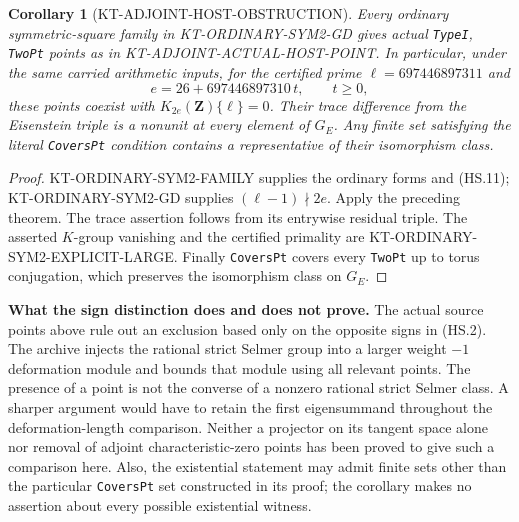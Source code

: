 \documentclass[11pt,a4paper]{article}
\newtheorem{corollary}[theorem]{Corollary}
\theoremstyle{definition}
\renewcommand{\paragraph}[1]{\par\smallskip\noindent\textbf{#1}\quad\ignorespaces}
\begin{document}
\begin{corollary}[KT-ADJOINT-HOST-OBSTRUCTION]
Every ordinary symmetric-square family in
KT-ORDINARY-SYM2-GD gives actual \texttt{TypeI},
\texttt{TwoPt} points as in KT-ADJOINT-ACTUAL-HOST-POINT.
In particular, under the same carried arithmetic inputs,
for the certified prime $\ell=697446897311$ and
\[
                   e=26+697446897310\,t,\qquad t\geq0,
\]
these points coexist with $K_{2e}(\mathbf Z)\{\ell\}=0$.
Their trace difference from the Eisenstein triple is a
nonunit at every element of $G_E$.  Any finite set satisfying
the literal \texttt{CoversPt} condition contains a
representative of their isomorphism class.
\end{corollary}
\begin{proof}
KT-ORDINARY-SYM2-FAMILY supplies the ordinary forms and
(HS.11); KT-ORDINARY-SYM2-GD supplies
$(\ell-1)\nmid2e$.  Apply the preceding theorem.
The trace assertion follows from its entrywise residual
triple.  The asserted $K$-group vanishing and the certified
primality are KT-ORDINARY-SYM2-EXPLICIT-LARGE.
Finally \texttt{CoversPt} covers every \texttt{TwoPt}
up to torus conjugation, which preserves the isomorphism
class on $G_E$.
\end{proof}

\paragraph{What the sign distinction does and does not prove.}
The actual source points above rule out an exclusion based
only on the opposite signs in (HS.2).  The archive injects
the rational strict Selmer group into a larger weight
$-1$ deformation module and bounds that module using all
relevant points.  The presence of a point is not the
converse of a nonzero rational strict Selmer class.
A sharper argument would have to retain the first
eigensummand throughout the deformation-length comparison.
Neither a projector on its tangent space alone nor removal
of adjoint characteristic-zero points has been proved to
give such a comparison here.  Also, the existential
 statement may admit finite sets other
than the particular \texttt{CoversPt} set constructed in
its proof; the corollary makes no assertion about every
possible existential witness.
\end{document}
